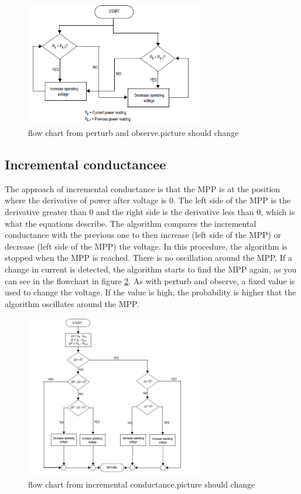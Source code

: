 \begin{figure}[htbp]
	\begin{center}
		\includegraphics[width=0.7\textwidth]{../Pictures/flow_chart_perturb_observe}
		\caption{flow chart from perturb and observe.picture should change }
		\label{fcperturbandobserve}
	\end{center}	
\end{figure}

\subsection{Incremental conductancee}
The approach of incremental conductance is that the MPP is at the position where the derivative of power after voltage is 0. The left side of the MPP is the derivative greater than 0 and the right side is the derivative less than 0, which is what the equations describe. The algorithm compares the incremental conductance with the previous one to then increase (left side of the MPP) or decrease (left side of the MPP) the voltage.  In this procedure, the algorithm is stopped when the MPP is reached. There is no oscillation around the MPP. If a change in current is detected, the algorithm starts to find the MPP again, as you can see in the flowchart in figure \ref{fcincrementalc}. As with perturb and observe, a fixed value is used to change the voltage. If the value is high, the probability is higher that the algorithm oscillates around the MPP. 

\begin{figure}[htbp]
	\begin{center}
		\includegraphics[width=0.7\textwidth]{../Pictures/flow_chart_incremental_conductance}
		\caption{flow chart from incremental conductance.picture should change }
		\label{fcincrementalc}
	\end{center}	
\end{figure}

